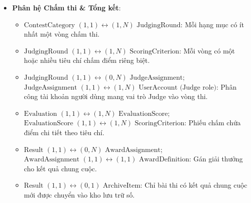 \begin{itemize}
    \begin{itemize}
        \item $\text{Registration } (1,1) \longleftrightarrow (0,N) \text{ Submission}$: Một đơn đăng ký có thể nộp nhiều bài thi vào các hạng mục cho phép.
        \item $\text{FilmFrame } (1,1) \longleftrightarrow (0,N) \text{ Submission}$: Khung hình được sử dụng làm tác phẩm dự thi.
        \item $\text{Submission } (1,1) \longleftrightarrow (1,1) \text{ VerificationCase}$: Mỗi bài thi có đúng một hồ sơ thẩm định chính thức.
        \item $\text{Submission } (1,1) \longleftrightarrow (0,N) \text{ AIAnalysisResult}$: Một bài thi có thể có nhiều kết quả phân tích từ các mô hình AI khác nhau.
    \end{itemize}
    \item \textbf{Phân hệ Chấm thi \& Tổng kết}:
    \begin{itemize}
        \item $\text{ContestCategory } (1,1) \longleftrightarrow (1,N) \text{ JudgingRound}$: Mỗi hạng mục có ít nhất một vòng chấm thi.
        \item $\text{JudgingRound } (1,1) \longleftrightarrow (1,N) \text{ ScoringCriterion}$: Mỗi vòng có một hoặc nhiều tiêu chí chấm điểm riêng biệt.
        \item $\text{JudgingRound } (1,1) \longleftrightarrow (0,N) \text{ JudgeAssignment}$; \\
        $\text{JudgeAssignment } (1,1) \longleftrightarrow (1,N) \text{ UserAccount (Judge role)}$: Phân công tài khoản người dùng mang vai trò Judge vào vòng thi.
        \item $\text{Evaluation } (1,1) \longleftrightarrow (1,N) \text{ EvaluationScore}$; \\
        $\text{EvaluationScore } (1,1) \longleftrightarrow (1,N) \text{ ScoringCriterion}$: Phiếu chấm chứa điểm chi tiết theo tiêu chí.
        \item $\text{Result } (1,1) \longleftrightarrow (0,N) \text{ AwardAssignment}$; \\
        $\text{AwardAssignment } (1,1) \longleftrightarrow (1,1) \text{ AwardDefinition}$: Gán giải thưởng cho kết quả chung cuộc.
        \item $\text{Result } (1,1) \longleftrightarrow (0,1) \text{ ArchiveItem}$: Chỉ bài thi có kết quả chung cuộc mới được chuyển vào kho lưu trữ số.
    \end{itemize}

\end{itemize}
